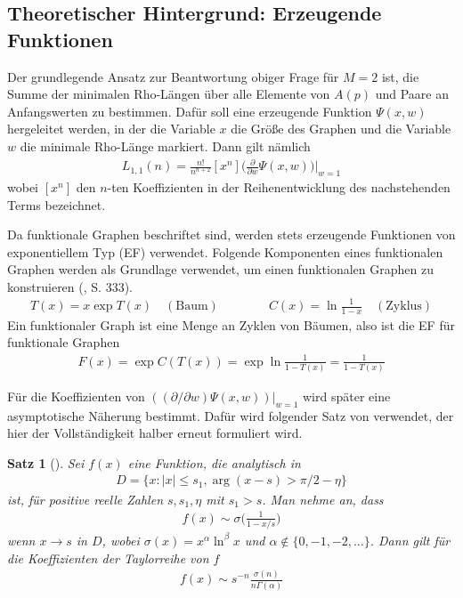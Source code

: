 \documentclass[a4paper, 10pt, ngerman]{article}
\newtheorem{theorem}{Satz}
\begin{document}
\subsection{Theoretischer Hintergrund: Erzeugende Funktionen}

Der grundlegende Ansatz zur Beantwortung obiger Frage für $M = 2$ ist, die Summe der minimalen Rho-Längen über alle Elemente von $A(p)$ und Paare an Anfangswerten zu bestimmen. Dafür soll eine erzeugende Funktion $\Psi(x, w)$ hergeleitet werden, in der die Variable $x$ die Größe des Graphen und die Variable $w$ die minimale Rho-Länge markiert. Dann gilt nämlich
\begin{align*}
    L_{1, 1}(n) = \frac {n!}{n^{n + 2}} [x^n] \Bigg (\frac {\partial} {\partial w} \Psi(x, w) \Bigg ) \Bigg \vert_{w = 1}
\end{align*}
wobei $[x^n]$ den $n$-ten Koeffizienten in der Reihenentwicklung des nachstehenden Terms bezeichnet.

Da funktionale Graphen beschriftet sind, werden stets erzeugende Funktionen von exponentiellem Typ (EF) verwendet. Folgende Komponenten eines funktionalen Graphen werden als Grundlage verwendet, um einen funktionalen Graphen zu konstruieren (\cite{fo90}, S. 333).
\begin{align*}
    T(x) = x \exp T(x) \quad (\text{Baum}) \qquad\qquad C(x) = \ln \frac {1} {1 - x} \quad (\text{Zyklus})
\end{align*}
Ein funktionaler Graph ist eine Menge an Zyklen von Bäumen, also ist die EF für funktionale Graphen
\begin{align*}
    F(x) = \exp C(T(x)) = \exp \ln \frac 1 {1 - T(x)} = \frac 1 {1 - T(x)}
\end{align*}

Für die Koeffizienten von $((\partial / \partial w) \Psi(x, w)) |_{w = 1}$ wird später eine asymptotische Näherung bestimmt. Dafür wird folgender Satz von \cite{fo90} verwendet, der hier der Vollständigkeit halber erneut formuliert wird.

\begin{theorem}[\cite{fo90}]
    Sei $f(x)$ eine Funktion, die analytisch in
    \begin{align*}
        D = \{x : |x| \le s_1, \arg(x - s) > \pi/2 - \eta \}
    \end{align*}
    ist, für positive reelle Zahlen $s, s_1, \eta$ mit $s_1 > s$. Man nehme an, dass
    \begin{align*}
        f(x) \sim \sigma \bigg ( \frac 1 {1 - x/s} \bigg )
    \end{align*}
    wenn $x \to s$ in $D$, wobei $\sigma(x) = x^\alpha \ln^\beta x$ und $\alpha \notin \{0, -1, -2, \dots\}$. Dann gilt für die Koeffizienten der Taylorreihe von $f$
    \begin{align*}
        [x^n]f(x) \sim s^{-n} \frac {\sigma(n)}{n\Gamma(\alpha)}
    \end{align*}
\end{theorem}
\end{document}

